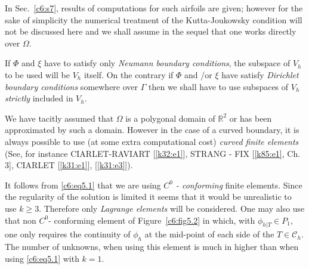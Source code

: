 In Sec.~\ref{c6:s7}, results of computations for such airfoils are 
given; however for the sake of simplicity the numerical treatment of 
the Kutta-Joukowsky condition will not be discussed here and we shall 
assume in the sequel that one works directly over $\Omega$.    

\begin{remark}\label{c6:rem5.2}%
If $\Phi$ and $\xi$ have to satisfy only {\em Neumann boundary 
conditions}, the subspace of $V_h$ to be used will be $V_h$ itself. On 
the contrary if $\Phi$ and /or $\xi$ have satisfy {\em Dirichlet 
boundary conditions} somewhere over $\Gamma $ then we shall have to use 
subspaces of $V_h$ {\em strictly} included in $V_h$.    
\setcounter{figure}{0}
\begin{figure}[H]
\caption{}\label{c6:fig5.1}
\end{figure}
\end{remark}

\begin{remark}\label{c6:rem5.3}%
We have tacitly assumed that $\Omega$ is a polygonal domain of 
$\mathds{R}^2$ or has been approximated by such a domain. However in 
the case of a curved boundary, it is always possible to use (at some 
extra computational cost) {\em curved finite elements} (See, for 
instance CIARLET-RAVIART [\ref{k32:e1}], STRANG - FIX [\ref{k85:e1},
  Ch. 3], CIARLET [\ref{k31:e1}], [\ref{k31:e3}]).     
\end{remark}

\begin{remark}\label{c6:rem5.4}%
It follows from \eqref{c6:eq5.1} that we are using {\em $C^0$ - 
conforming} finite elements. Since the regularity of the solution is 
limited it seems that it would be unrealistic to use $k \geq 3$. 
Therefore only {\em Lagrange elements} will be considered. One may also 
use that non $C^0$- conforming element of Figure~\ref{c6:fig5.2} in which, with 
$\phi_{h | T}\in P_1$, one only requires the continuity of $\phi_h$ 
at the mid-point of each side of the $T \in \mathscr{C}_h$. The 
number of unknowns, when using this element is much in higher than when 
using \eqref{c6:eq5.1} with $k = 1$.        
\end{remark}

